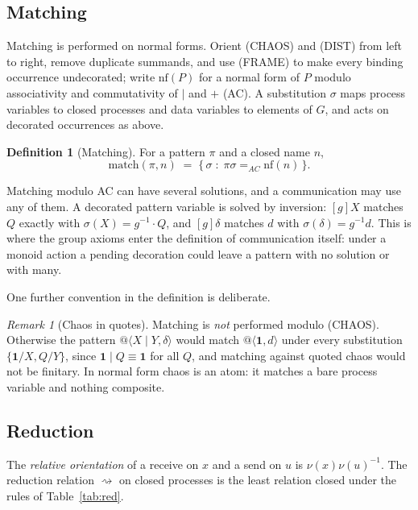 \documentclass[11pt]{article}
\makeatletter
\theoremstyle{definition}
\newtheorem{definition}[theorem]{Definition}
\theoremstyle{remark}
\newtheorem{remark}[theorem]{Remark}
\newcommand{\chaos}{\mathbf{1}}
\newcommand{\qn}[2]{@\langle #1, #2\rangle}
\newcommand{\act}[2]{#1\cdot #2}
\newcommand{\red}{\rightsquigarrow}
\newcommand{\scong}{\equiv}
\newcommand{\match}{\mathrm{match}}
\newcommand{\nf}{\mathrm{nf}}
\newcommand{\fr}[2]{[#1]#2}
\makeatother
\begin{document}
\subsection{Matching}

Matching is performed on normal forms. Orient (CHAOS) and (DIST) from left to
right, remove duplicate summands, and use (FRAME) to make every binding
occurrence undecorated; write $\nf(P)$ for a normal form of $P$ modulo
associativity and commutativity of $\mid$ and $+$ (AC). A substitution
$\sigma$ maps process variables to closed processes and data variables to
elements of $G$, and acts on decorated occurrences as above.

\begin{definition}[Matching]\label{def:match}
For a pattern $\pi$ and a closed name $n$,
\[
\match(\pi,n) \;=\; \{\,\sigma \;:\; \pi\sigma =_{AC} \nf(n)\,\}.
\]
\end{definition}

Matching modulo AC can have several solutions, and a communication may use any
of them. A decorated pattern variable is solved by inversion: $\fr{g}{X}$
matches $Q$ exactly with $\sigma(X)=\act{g^{-1}}{Q}$, and $\fr{g}{\delta}$
matches $d$ with $\sigma(\delta)=g^{-1}d$. This is where the group axioms enter
the definition of communication itself: under a monoid action a pending
decoration could leave a pattern with no solution or with many.

One further convention in the definition is deliberate.

\begin{remark}[Chaos in quotes]\label{rem:chaosmatch}
Matching is \emph{not} performed modulo (CHAOS). Otherwise the pattern
$\qn{X\mid Y}{\delta}$ would match $\qn{\chaos}{d}$ under every substitution
$\{\chaos/X, Q/Y\}$, since $\chaos\mid Q\scong\chaos$ for all $Q$, and matching
against quoted chaos would not be finitary. In normal form chaos is an atom:
it matches a bare process variable and nothing composite.
\end{remark}

\subsection{Reduction}

The \emph{relative orientation} of a receive on $x$ and a send on $u$ is
$\nu(x)\nu(u)^{-1}$. The reduction relation $\red$ on closed processes is the
least relation closed under the rules of Table~\ref{tab:red}.
\end{document}
